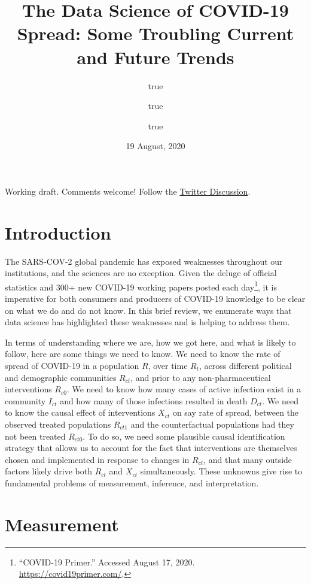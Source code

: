 \documentclass[
]{article}
\title{The Data Science of COVID-19 Spread: Some Troubling Current and
Future Trends}
\author{true \and true \and true}
\date{19 August, 2020}
\begin{document}
\maketitle

Working draft. Comments welcome! Follow the
\href{https://twitter.com/RexDouglass/status/1295391498477826053}{Twitter
Discussion}.

\hypertarget{introduction}{%
\section{Introduction}\label{introduction}}

The SARS-COV-2 global pandemic has exposed weaknesses throughout our
institutions, and the sciences are no exception. Given the deluge of
official statistics and 300+ new COVID-19 working papers posted each
day\footnote{``COVID-19 Primer.'' Accessed August 17, 2020.
  \url{https://covid19primer.com/}.}, it is imperative for both
consumers and producers of COVID-19 knowledge to be clear on what we do
and do not know. In this brief review, we enumerate ways that data
science has highlighted these weaknesses and is helping to address them.

In terms of understanding where we are, how we got here, and what is
likely to follow, here are some things we need to know. We need to know
the rate of spread of COVID-19 in a population \(R\), over time
\(R_{t}\), across different political and demographic communities
\(R_{ct}\), and prior to any non-pharmaceutical interventions
\(R_{c0}\). We need to know how many cases of active infection exist in
a community \(I_{ct}\) and how many of those infections resulted in
death \(D_{ct}\). We need to know the causal effect of interventions
\(X_{ct}\) on say rate of spread, between the observed treated
populations \(R_{ct1}\) and the counterfactual populations had they not
been treated \(R_{ct0}\). To do so, we need some plausible causal
identification strategy that allows us to account for the fact that
interventions are themselves chosen and implemented in response to
changes in \(R_{ct}\), and that many outside factors likely drive both
\(R_{ct}\) and \(X_{ct}\) simultaneously. These unknowns give rise to
fundamental problems of measurement, inference, and interpretation.

\hypertarget{measurement}{%
\section{Measurement}\label{measurement}}
\end{document}

